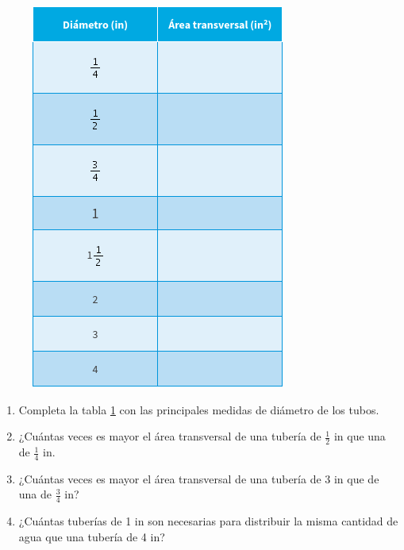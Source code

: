 \documentclass[11pt]{book}
\begin{document}
\begin{enumerate}
        \begin{minipage}[t]{0.5\textwidth}
          \begin{figure}[H]
            \centering
            \includegraphics[width=.8\linewidth]{tabla_tubos.png}
            \label{tab:tabla_tubos}
          \end{figure}
        \end{minipage}\hfill
        \begin{minipage}[t]{0.45\textwidth}
          \begin{enumerate}
            \item Completa la tabla \ref{tab:tabla_tubos} con las principales medidas de diámetro de los tubos.
            \item ¿Cuántas veces es mayor el área transversal de una tubería de $\frac{1}{2}$ in que una de $\frac{1}{4}$ in.
            \item ¿Cuántas veces es mayor el área transversal de una tubería de 3 in que de una de $\frac{3}{4}$ in?
            \item ¿Cuántas tuberías de 1 in son necesarias para distribuir la misma cantidad de agua que una tubería de 4 in?
          \end{enumerate}
        \end{minipage}


\end{enumerate}
\end{document}
